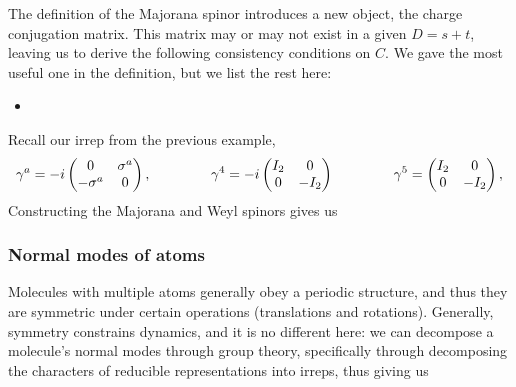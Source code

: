 \documentclass[11pt]{article}
\begin{document}
The definition of the Majorana spinor introduces a new object,
the charge conjugation matrix. This matrix may or may not exist
in a given $D = s + t$, leaving us to derive the following consistency
conditions on $C$. We gave the most useful one in the definition,
but we list the rest here:
\begin{itemize}
    \item {}
\end{itemize}

\begin{eexample}
    [Majorana and Weyl spinors in $D = 3 + 1$]
    Recall our irrep from the previous example,
    \begin{align*}
        \gamma^a = - i \begin{pmatrix}
            0 & \sigma^a\\
            - \sigma^a & 0
        \end{pmatrix},
        \hspace{1.5cm}
        \gamma^4 = -i \begin{pmatrix}
            I_2 & 0\\
            0 & -I_2
        \end{pmatrix}
        \hspace{1.5cm}
        \gamma^5 = \begin{pmatrix}
            I_2 & 0\\
            0 & -I_2
        \end{pmatrix},
    \end{align*}
    Constructing the Majorana and Weyl spinors gives us 
\end{eexample}





\subsubsection{Normal modes of atoms}

Molecules with multiple atoms generally obey
a periodic structure, and thus they are symmetric
under certain operations (translations and rotations).
Generally, symmetry constrains dynamics, and it is no different
here: we can decompose a molecule's normal modes through
group theory, specifically through decomposing the characters
of reducible representations into irreps, thus giving us 
\end{document}
